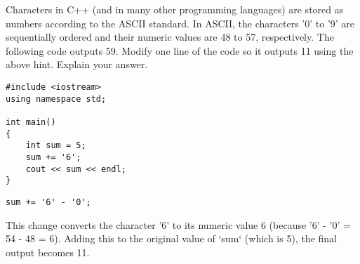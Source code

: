 \usepackage{mc_bubble}
\usepackage{magicswitch}
\usepackage{format}

\item

Characters in C++ (and in many other programming languages) are stored as numbers according to the ASCII standard. 
In ASCII, the characters '0' to '9' are sequentially ordered and their numeric values are 48 to 57, respectively. 
The following code outputs 59. Modify one line of the code so it outputs 11 using the above hint. Explain your answer.

\begin{AnswerArea}
\begin{verbatim}
#include <iostream>
using namespace std;

int main()
{
    int sum = 5;
    sum += '6';
    cout << sum << endl;
}
\end{verbatim}
\vspace{3in}
\end{AnswerArea}




\begin{Solution}
\begin{verbatim}
sum += '6' - '0';
\end{verbatim}
This change converts the character '6' to its numeric value 6 (because '6' - '0' = 54 - 48 = 6).  
Adding this to the original value of `sum` (which is 5), the final output becomes 11.
\end{Solution}


